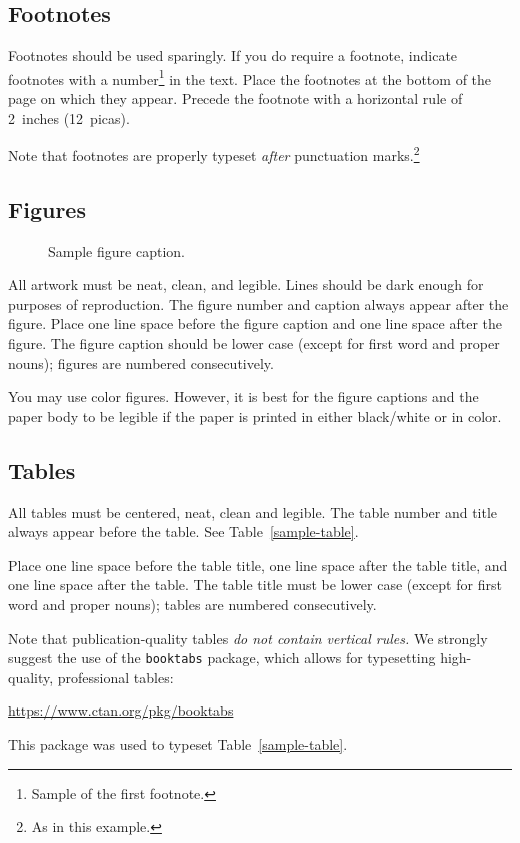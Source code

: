 \documentclass{article}
\begin{document}
\subsection{Footnotes}

Footnotes should be used sparingly.  If you do require a footnote, indicate
footnotes with a number\footnote{Sample of the first footnote.} in the
text. Place the footnotes at the bottom of the page on which they appear.
Precede the footnote with a horizontal rule of 2~inches (12~picas).

Note that footnotes are properly typeset \emph{after} punctuation
marks.\footnote{As in this example.}

\subsection{Figures}

\begin{figure}
  \centering
  \fbox{\rule[-.5cm]{0cm}{4cm} \rule[-.5cm]{4cm}{0cm}}
  \caption{Sample figure caption.}
\end{figure}

All artwork must be neat, clean, and legible. Lines should be dark enough for
purposes of reproduction. The figure number and caption always appear after the
figure. Place one line space before the figure caption and one line space after
the figure. The figure caption should be lower case (except for first word and
proper nouns); figures are numbered consecutively.

You may use color figures.  However, it is best for the figure captions and the
paper body to be legible if the paper is printed in either black/white or in
color.

\subsection{Tables}

All tables must be centered, neat, clean and legible.  The table number and
title always appear before the table.  See Table~\ref{sample-table}.

Place one line space before the table title, one line space after the
table title, and one line space after the table. The table title must
be lower case (except for first word and proper nouns); tables are
numbered consecutively.

Note that publication-quality tables \emph{do not contain vertical rules.} We
strongly suggest the use of the \verb+booktabs+ package, which allows for
typesetting high-quality, professional tables:
\begin{center}
  \url{https://www.ctan.org/pkg/booktabs}
\end{center}
This package was used to typeset Table~\ref{sample-table}.
\end{document}
